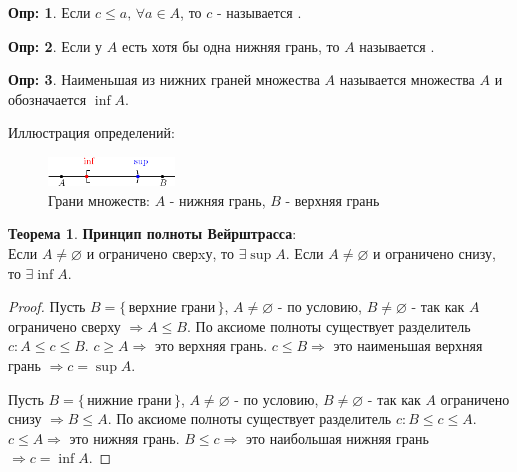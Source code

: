 \documentclass[12pt]{article}
\theoremstyle{definition}
\newtheorem{defn}{Опр:}
\newtheorem{theorem}{Теорема}
\begin{document}
\begin{defn}
	Если $c \leq a, \,\forall a \in A$, то $c$ - называется .
\end{defn}
\begin{defn}
	Если у $A$ есть хотя бы одна нижняя грань, то $A$ называется .
\end{defn}
\begin{defn}
	Наименьшая из нижних граней множества $A$ называется  множества $A$ и обозначается $\inf{A}$.
\end{defn}

Иллюстрация определений:
\begin{figure}[H]
	\centering
	\includegraphics[width=0.3\textwidth]{6_3.eps}
	\caption{Грани множеств: $A$ - нижняя грань, $B$ - верхняя грань}
	\label{fig:6_4}
\end{figure}

\begin{theorem}\textbf{Принцип полноты Вейрштрасса}:\\
	 Если $A \neq \varnothing$ и ограничено сверxу, то $\exists \sup A$. Если $A \neq \varnothing$ и ограничено снизу, то $\exists \inf A$.
\end{theorem}
\begin{proof}
Пусть $B = \{\,\text{верхние грани}\,\}$, $A \neq \varnothing$ - по условию, $B \neq \varnothing$ - так как $A$ ограничено сверху $\Rightarrow A \leq B$. По аксиоме полноты существует разделитель $c \colon A \leq c \leq B$. $c \geq A \Rightarrow$ это верхняя грань. $c \leq B \Rightarrow$ это наименьшая верхняя грань $\Rightarrow c = \sup A$.

Пусть $B = \{\,\text{нижние грани}\,\}$, $A \neq \varnothing$ - по условию, $B \neq \varnothing$ - так как $A$ ограничено снизу $\Rightarrow B \leq A$. По аксиоме полноты существует разделитель $c \colon B \leq c \leq A$. $c \leq A \Rightarrow$ это нижняя грань. $B \leq c \Rightarrow$ это наибольшая нижняя грань $\Rightarrow c = \inf A$.
\end{proof}
\end{document}

